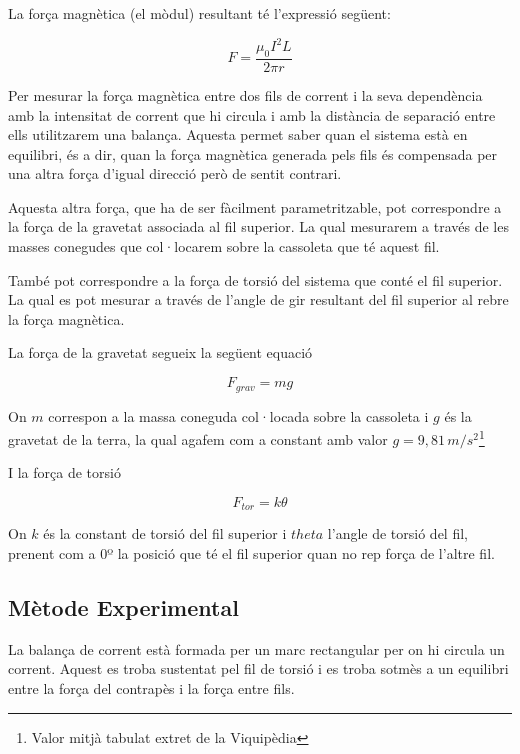 \documentclass[11pt]{article}
\numberwithin{equation}{section}
\numberwithin{figure}{section}
\numberwithin{table}{section}
\begin{document}
La força magnètica (el mòdul) resultant té l'expressió següent:

\begin{equation}\label{eq: PR2_Fm_entre_fils}
    F = \frac{\mu_0I^2L}{2\pi r}
\end{equation}

Per mesurar la força magnètica entre dos fils de corrent i la seva dependència amb la intensitat de corrent que hi circula i amb la distància de separació entre ells utilitzarem una balança. Aquesta permet saber quan el sistema està en equilibri, és a dir, quan la força magnètica generada pels fils és compensada per una altra força d'igual direcció però de sentit contrari. 

Aquesta altra força, que ha de ser fàcilment parametritzable, pot correspondre a la força de la gravetat associada al fil superior. La qual mesurarem a través de les masses conegudes que col·locarem sobre la cassoleta que té aquest fil.

També pot correspondre a la força de torsió del sistema que conté el fil superior. La qual es pot mesurar a través de l'angle de gir resultant del fil superior al rebre la força magnètica.
 
La força de la gravetat segueix la següent equació

\begin{equation}\label{eq: PR2_Fgrav}
    F_{grav} = mg
\end{equation}

On $m$ correspon a la massa coneguda col·locada sobre la cassoleta i $g$ és la gravetat de la terra, la qual agafem com a constant amb valor $g = 9,81 \, m/s^2$\footnote{Valor mitjà tabulat extret de la Viquipèdia}

I la força de torsió

\begin{equation}\label{PR2_Ftorsio}
    F_{tor} = k\theta
\end{equation}

On $k$ és la constant de torsió del fil superior i $theta$ l'angle de torsió del fil, prenent com a 0º la posició que té el fil superior quan no rep força de l'altre fil.

\subsection{Mètode Experimental}\label{sec: PR2_met_exp}

La balança de corrent està formada per un marc rectangular per on hi circula un corrent. Aquest es troba sustentat pel fil de torsió i es troba sotmès a un equilibri entre la força del contrapès i la força entre fils. 
\end{document}
